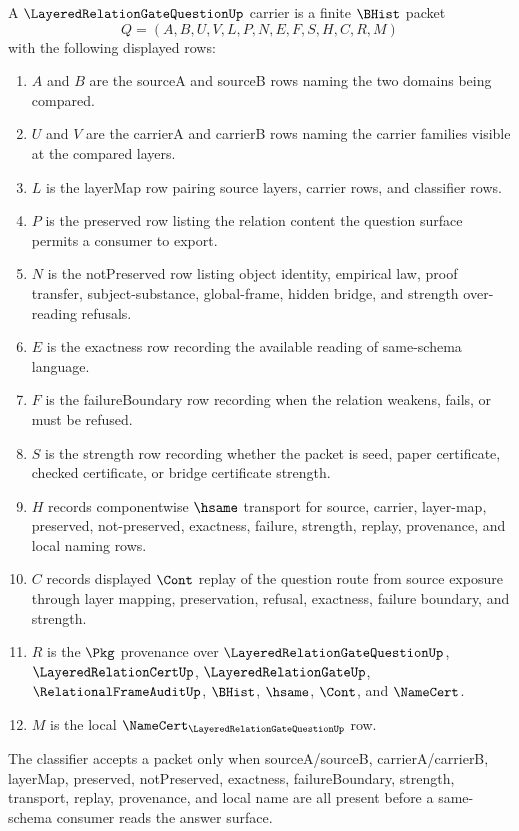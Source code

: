 \begin{definition}
\label{def:layered-relation-gate-question-carrier}
A $\LayeredRelationGateQuestionUp$ carrier is a finite $\BHist$ packet
$$
Q=(A,B,U,V,L,P,N,E,F,S,H,C,R,M)
$$
with the following displayed rows:
\begin{enumerate}
\item $A$ and $B$ are the sourceA and sourceB rows naming the two domains being compared.
\item $U$ and $V$ are the carrierA and carrierB rows naming the carrier families visible at the compared layers.
\item $L$ is the layerMap row pairing source layers, carrier rows, and classifier rows.
\item $P$ is the preserved row listing the relation content the question surface permits a consumer to export.
\item $N$ is the notPreserved row listing object identity, empirical law, proof transfer, subject-substance, global-frame, hidden bridge, and strength over-reading refusals.
\item $E$ is the exactness row recording the available reading of same-schema language.
\item $F$ is the failureBoundary row recording when the relation weakens, fails, or must be refused.
\item $S$ is the strength row recording whether the packet is seed, paper certificate, checked certificate, or bridge certificate strength.
\item $H$ records componentwise $\hsame$ transport for source, carrier, layer-map, preserved, not-preserved, exactness, failure, strength, replay, provenance, and local naming rows.
\item $C$ records displayed $\Cont$ replay of the question route from source exposure through layer mapping, preservation, refusal, exactness, failure boundary, and strength.
\item $R$ is the $\Pkg$ provenance over $\LayeredRelationGateQuestionUp$, $\LayeredRelationCertUp$, $\LayeredRelationGateUp$, $\RelationalFrameAuditUp$, $\BHist$, $\hsame$, $\Cont$, and $\NameCert$.
\item $M$ is the local $\NameCert_{\LayeredRelationGateQuestionUp}$ row.
\end{enumerate}
The classifier accepts a packet only when sourceA/sourceB, carrierA/carrierB, layerMap, preserved, notPreserved, exactness, failureBoundary, strength, transport, replay, provenance, and local name are all present before a same-schema consumer reads the answer surface.
\end{definition}

